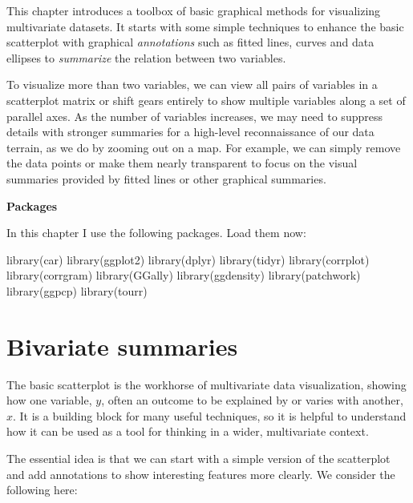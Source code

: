 \documentclass[
  letterpaper,
  10pt,
  krantz2]{krantz}
\makeatletter
\newenvironment{Shaded}{\begin{snugshade}}{\end{snugshade}}
\newcommand{\FunctionTok}[1]{\textcolor[rgb]{0.28,0.35,0.67}{#1}}
\newcommand{\NormalTok}[1]{\textcolor[rgb]{0.00,0.23,0.31}{#1}}
\newenvironment{kframe}{%
  \medskip{}
  \setlength{\fboxsep}{.8em}
  \def\at@end@of@kframe{}%
  \ifinner\ifhmode%
  \def\at@end@of@kframe{\end{minipage}}%
  \begin{minipage}{\columnwidth}%
  \fi\fi%
  \def\FrameCommand##1{\hskip\@totalleftmargin \hskip-\fboxsep
  \colorbox{shadecolor}{##1}\hskip-\fboxsep
      \hskip-\linewidth \hskip-\@totalleftmargin \hskip\columnwidth}%
  \MakeFramed {\advance\hsize-\width
    \@totalleftmargin\z@ \linewidth\hsize
    \@setminipage}}%
{\par\unskip\endMakeFramed%
  \at@end@of@kframe}
\renewenvironment{Shaded}{\begin{kframe}}{\end{kframe}}
\makeatother
\begin{document}
This chapter introduces a toolbox of basic graphical methods for
visualizing multivariate datasets. It starts with some simple techniques
to enhance the basic scatterplot with graphical \emph{annotations} such
as fitted lines, curves and data ellipses to \emph{summarize} the
relation between two variables.

To visualize more than two variables, we can view all pairs of variables
in a scatterplot matrix or shift gears entirely to show multiple
variables along a set of parallel axes. As the number of variables
increases, we may need to suppress details with stronger summaries for a
high-level reconnaissance of our data terrain, as we do by zooming out
on a map. For example, we can simply remove the data points or make them
nearly transparent to focus on the visual summaries provided by fitted
lines or other graphical summaries.

\textbf{Packages}

In this chapter I use the following packages. Load them now:

\begin{Shaded}
\begin{Highlighting}[]
\FunctionTok{library}\NormalTok{(car)}
\FunctionTok{library}\NormalTok{(ggplot2)}
\FunctionTok{library}\NormalTok{(dplyr)}
\FunctionTok{library}\NormalTok{(tidyr)}
\FunctionTok{library}\NormalTok{(corrplot)}
\FunctionTok{library}\NormalTok{(corrgram)}
\FunctionTok{library}\NormalTok{(GGally)}
\FunctionTok{library}\NormalTok{(ggdensity)}
\FunctionTok{library}\NormalTok{(patchwork)}
\FunctionTok{library}\NormalTok{(ggpcp)}
\FunctionTok{library}\NormalTok{(tourr)}
\end{Highlighting}
\end{Shaded}

\section{Bivariate summaries}\label{sec-bivariate_summaries}

The basic scatterplot is the workhorse of multivariate data
visualization, showing how one variable, \(y\), often an outcome to be
explained by or varies with another, \(x\). It is a building block for
many useful techniques, so it is helpful to understand how it can be
used as a tool for thinking in a wider, multivariate context.

The essential idea is that we can start with a simple version of the
scatterplot and add annotations to show interesting features more
clearly. We consider the following here:
\end{document}
